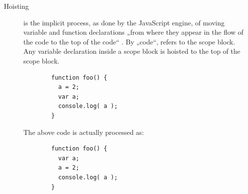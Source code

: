 \begin{description}
\item[Hoisting]
is the implicit process, as done by the JavaScript engine, of moving
variable and function declarations „from where they appear in the flow
of the code to the top of the code“ \cite{getify}. By „code“,
 refers to the scope block. Any variable declaration
inside a scope block is hoisted to the top of the scope block.

\begin{verbatim}
        function foo() {
          a = 2;
          var a;
          console.log( a );
        }
\end{verbatim}

The above code is actually processed as:

\begin{verbatim}
        function foo() {
          var a;
          a = 2;
          console.log( a );
        }
\end{verbatim}


\end{description}
